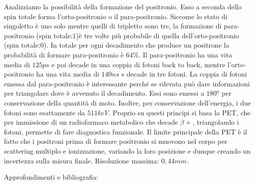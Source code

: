 Analizziamo la possibilità della formazione del positronio. Esso a seconda dello spin totale forma l'orto-positronio o il para-positronio. Siccome lo stato di singoletto è uno solo mentre quelli di tripletto sono tre, la formazione di para-positronio (spin totale:$1$)è tre volte più probabile di quella dell'orto-positronio (spin totale:$0$). 
In totale per ogni decadimento che produce un positrone la probabilità di formare para-positronio è 64\%. 
Il para-positronio ha una vita media di $125 ps$ e poi decade in una coppia di fotoni back to back, mentre l'orto-positronio ha una vita media di $140 ns$ e decade in tre fotoni. La coppia di fotoni emessa dal para-positronio è interessante perché se rilevata può dare informazioni per triangolare dove è avvenuto il decadimento. Essi sono emessi a $\ang{180}$ per conservazione della quantità di moto. Inoltre, per conservazione dell'energia, i due fotoni sono esattamente da $511 keV$.
Proprio su questi principi si basa la PET, che per immissione di un radiofarmaco metabolico che decade $\beta+$, triangolando i fotoni, permette di fare diagnostica funzionale.
Il limite principale della PET è il fatto che i positroni prima di formare positronio si muovono nel corpo per scattering multiplo e ionizzazione, variando la loro posizione e dunque creando un incertezza sulla misura finale.
Risoluzione massima: $0,44 mm$.

Approfondimenti e bibliografia: \cite{PET1} \cite{PET2}

